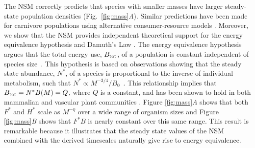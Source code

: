 \documentclass{pnastwo}
\begin{document}
\begin{article}
The NSM correctly predicts that species with smaller masses have larger steady-state population densities (Fig.~\ref{fig:mass}\emph{A}).
Similar predictions have been made for carnivore populations using alternative consumer-resource models \cite{DeLong:2012kw}.
Moreover, we show that the NSM provides independent theoretical support for the energy equivalence hypothesis and Damuth's Law \cite{Damuth:1987kr,allen2002,enquist1998}.
The energy equivalence hypothesis argues that the total energy use, $B_{\rm tot}$, of a population is constant independent of species size~\cite{Damuth:1987kr,allen2002,enquist1998}. %
This hypothesis is based on observations showing that the steady state abundance, $N^*$, of a species is proportional to the inverse of individual metabolism, such that $N^*\propto M^{-3/4}/B_{0}$~\cite{allen2002,enquist1998}.
This relationship implies that $B_{\rm tot}=N^*B(M)=Q$, where $Q$ is a constant, and has been shown to hold in both mammalian and vascular plant communities \cite{Damuth:1987kr,allen2002,enquist1998}.
Figure \ref{fig:mass}\emph{A} shows that both $F^{*}$ and $H^{*}$ scale as $M^{-\eta}$ over a wide range of organism sizes and Figure \ref{fig:mass}\emph{B} shows that $F^{*}B$ is nearly constant over this same range.
This result is remarkable because it illustrates that the steady state values of the NSM combined with the derived timescales naturally give rise to energy equivalence.


\end{article}
\end{document}
